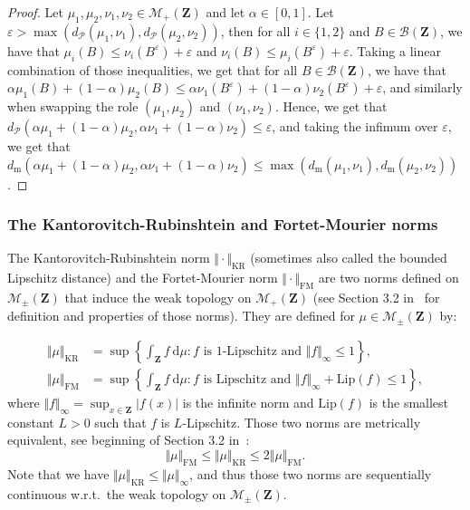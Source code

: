 \documentclass{amsart}
\newcommand{\wrt}{w.r.t.\ }
\theoremstyle{plain}
\theoremstyle{definition}
\newcommand{\Space}{\mathbf{Z}}
\newcommand{\Borel}{\mathcal{B}(\Space)}
\newcommand{\Meas}{\mathcal{M}_+(\Space)}
\newcommand{\SignedMeas}{\mathcal{M}_{\pm}(\Space)}
\newcommand{\TotalMass}[1]{\norm{#1}_\infty}
\newcommand{\m}{\mathrm{m}}
\newcommand{\dmeas}{d_\m}
\newcommand{\dmeasP}{d_{\mathcal{P}}}
\newcommand{\mKR}{\text{KR}}
\newcommand{\NmeasKR}[1]{\Vert#1\Vert_{\mKR}}
\newcommand{\NmeasKRSymbol}{\Vert\cdot\Vert_{\mKR}}
\newcommand{\mFM}{\text{FM}}
\newcommand{\NmeasFM}[1]{\Vert#1\Vert_{\mFM}}
\newcommand{\NmeasFMSymbol}{\Vert\cdot\Vert_{\mFM}}
\newcommand{\drv}{\mathrm{d}}
\newcommand{\norm}[1]{\Vert#1\Vert}
\newcommand{\eps}{\varepsilon}
\begin{document}
\begin{proof}
Let $\mu_1,\mu_2,\nu_1,\nu_2 \in \Meas$ and let $\alpha \in [0,1]$.
Let $\eps > \max( \dmeasP(\mu_1,\nu_1), \dmeasP(\mu_2,\nu_2) )$,
	then for all $i\in\{1,2\}$ and $B\in\Borel$, we have that
	$\mu_i(B) \leq \nu_i(B^\eps) + \eps$
	and $\nu_i(B) \leq \mu_i(B^\eps) + \eps$.
Taking a linear combination of those inequalities, we get that
	for all $B\in\Borel$, we have that
	$\alpha \mu_1(B) + (1-\alpha) \mu_2(B) \leq \alpha \nu_1(B^\eps) + (1-\alpha) \nu_2(B^\eps) + \eps$,
	and similarly when swapping the role $(\mu_1,\mu_2)$ and $(\nu_1,\nu_2)$.
Hence, we get that $\dmeasP( \alpha \mu_1 + (1-\alpha) \mu_2, \alpha \nu_1 + (1-\alpha) \nu_2) \leq \eps$,
	and taking the infimum over $\eps$, we get that
	$\dmeas( \alpha \mu_1 + (1-\alpha) \mu_2, \alpha \nu_1 + (1-\alpha) \nu_2)
		\leq \max( \dmeas(\mu_1,\nu_1), \dmeas(\mu_2,\nu_2) )$.
\end{proof}




\subsubsection{The Kantorovitch-Rubinshtein and Fortet-Mourier norms}
	\label{sec:def_KR_FM_norms}

The Kantorovitch-Rubinshtein norm $\NmeasKRSymbol$
(sometimes also called the bounded Lipschitz distance)
and the Fortet-Mourier norm $\NmeasFMSymbol$
are two norms defined on $\SignedMeas$ 
that induce the weak topology on $\Meas$
(see Section 3.2 in~\cite{Bogachev} for definition and properties of those norms). 
They are defined for $\mu\in\SignedMeas$ by:

\begin{align*}
  \NmeasKR{\mu}
  &= \sup\left\{ 
\int_{\Space} f\ \drv \mu : \text{$f$ is $1$-Lipschitz and }
\norm{f}_\infty \leq 1\right\}	 ,\\
  \NmeasFM{\mu}
  &= \sup\left\{ 
\int_{\Space} f\ \drv \mu : \text{$f$ is Lipschitz and }
\norm{f}_\infty + \text{Lip}(f) \leq 1\right\}	 ,
\end{align*}
where $\norm{f}_\infty = \sup_{x\in \Space} \vert f(x) \vert$ is the infinite norm
and $\text{Lip}(f)$ is the smallest constant $L>0$ such that $f$ is $L$-Lipschitz.
Those two norms are metrically equivalent, see beginning of Section 3.2 in~\cite{Bogachev}:
\begin{equation}
  \label{eq:met-equiv}
\NmeasFM{\mu} \leq \NmeasKR{\mu} \leq 2 \NmeasFM{\mu}.
\end{equation}
Note that we have $\NmeasKR{\mu} \leq \TotalMass{\mu}$,
	and thus those two norms are
	sequentially continuous \wrt the weak topology on $\SignedMeas$.
\end{document}
